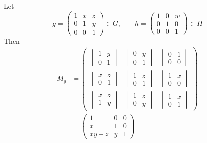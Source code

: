 \documentclass[a4paper]{article}
\begin{document}
Let \[ g = \begin{pmatrix}
    1 & x & z \\
    0 & 1 & y \\
    0 & 0 & 1
\end{pmatrix} \in G, \qquad
h = \begin{pmatrix}
    1 & 0 & w \\
    0 & 1 & 0 \\
    0 & 0 & 1
\end{pmatrix} \in H
\]
Then
\begin{align*}
M_g &= \begin{pmatrix}
\begin{vmatrix} 1 & y \\ 0 & 1 \end{vmatrix} &
\begin{vmatrix} 0 & y \\ 0 & 1 \end{vmatrix} &
\begin{vmatrix} 0 & 1 \\ 0 & 0 \end{vmatrix} \\[2.5ex]
\begin{vmatrix} x & z \\ 0 & 1 \end{vmatrix} &
\begin{vmatrix} 1 & z \\ 0 & 1 \end{vmatrix} &
\begin{vmatrix} 1 & x \\ 0 & 0 \end{vmatrix} \\[2.5ex]
\begin{vmatrix} x & z \\ 1 & y \end{vmatrix} &
\begin{vmatrix} 1 & z \\ 0 & y \end{vmatrix} &
\begin{vmatrix} 1 & x \\ 0 & 1 \end{vmatrix}
\end{pmatrix} \\[1ex]
&= \begin{pmatrix}
1 & 0 & 0 \\
x & 1 & 0 \\
xy - z & y & 1
\end{pmatrix} \\[1ex]

\end{align*}
\end{document}
